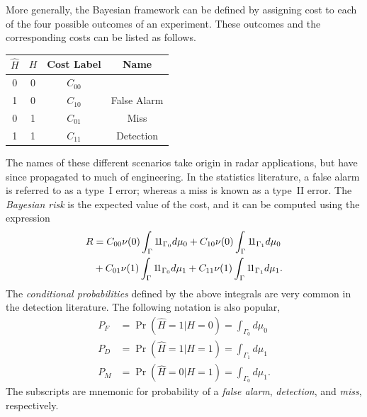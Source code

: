 More generally, the Bayesian framework can be defined by assigning cost to each of the four possible outcomes of an experiment.
These outcomes and the corresponding costs can be listed as follows.
\begin{center}
\begin{tabular}{|c|c|c|c|}
\hline
$\hat{H}$ & $H$ & Cost Label & Name\\
\hline
0 & 0 & $C_{00}$ &\\
1 & 0 & $C_{10}$ & False Alarm \\
0 & 1 & $C_{01}$ & Miss \\
1 & 1 & $C_{11}$ & Detection \\
\hline
\end{tabular}
\end{center}
The names of these different scenarios take origin in radar applications, but have since propagated to much of engineering.
In the statistics literature, a false alarm is referred to as a type~I error; whereas a miss is known as a type~II error.
The \emph{Bayesian risk} is the expected value of the cost, and it can be computed using the expression
\begin{equation} \label{equation:BayesianRisk}
\begin{split}
R &= C_{00} \nu (0) \int_{\Gamma} \mathrm{1\!1}_{ \Gamma_0 } d\mu_0
+ C_{10} \nu (0) \int_{\Gamma} \mathrm{1\!1}_{ \Gamma_1 } d\mu_0 \\
&+ C_{01} \nu (1) \int_{\Gamma} \mathrm{1\!1}_{ \Gamma_0 } d\mu_1
+ C_{11} \nu (1) \int_{\Gamma} \mathrm{1\!1}_{ \Gamma_1 } d\mu_1 .
\end{split}
\end{equation}
The \emph{conditional probabilities} defined by the above integrals are very common in the detection literature.
The following notation is also popular,
\begin{align*}
P_F &= \Pr \left( \hat{H} = 1 | H = 0 \right) = \int_{\Gamma_0} d\mu_0 \\
P_D &= \Pr \left( \hat{H} = 1 | H = 1 \right) = \int_{\Gamma_1} d\mu_1 \\
P_M &= \Pr \left( \hat{H} = 0 | H = 1 \right) = \int_{\Gamma_0} d\mu_1 .
\end{align*}
The subscripts are mnemonic for probability of a \emph{false alarm}, \emph{detection}, and \emph{miss}, respectively.

